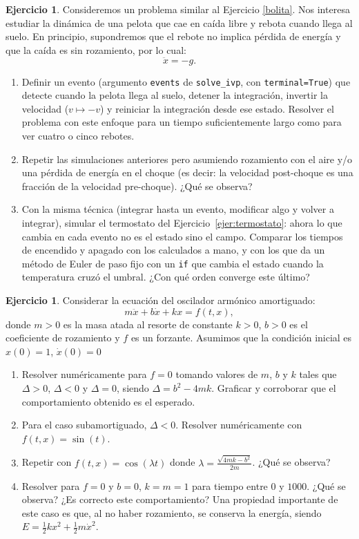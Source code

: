\documentclass[12pt, a4paper]{amsbook}
\theoremstyle{remark}
\theoremstyle{definition}
\newtheorem{ejer}[teo]{Ejercicio}
\numberwithin{section}{chapter}
\numberwithin{subsection}{section}
\numberwithin{equation}{section}
\numberwithin{figure}{chapter}
\begin{document}
\begin{ejer}\label{bouncing-ball}
Consideremos un problema similar al Ejercicio \ref{bolita}. Nos interesa estudiar la dinámica de una pelota que cae en caída libre y rebota cuando llega al suelo. En principio, supondremos que el rebote no implica pérdida de energía y que la caída es sin rozamiento, por lo cual: 
\[\ddot{x} = -g.\]
\begin{enumerate}
\item Definir un evento (argumento \lstinline{events} de \lstinline{solve_ivp}, con \lstinline{terminal=True}) que detecte cuando la pelota llega al suelo, detener la integración, invertir la velocidad ($v\mapsto -v$) y reiniciar la integración desde ese estado. Resolver el problema con este enfoque para un tiempo suficientemente largo como para ver cuatro o cinco rebotes. 
\item Repetir las simulaciones anteriores pero asumiendo rozamiento con el aire y/o una pérdida de energía en el choque (es decir: la velocidad post-choque es una fracción de la velocidad pre-choque). ¿Qué se observa?
\item Con la misma técnica (integrar hasta un evento, modificar algo y volver a integrar), simular el termostato del Ejercicio~\ref{ejer:termostato}: ahora lo que cambia en cada evento no es el estado sino el campo. Comparar los tiempos de encendido y apagado con los calculados a mano, y con los que da un método de Euler de paso fijo con un \lstinline{if} que cambia el estado cuando la temperatura cruzó el umbral. ¿Con qué orden converge este último?
\end{enumerate}
\end{ejer}

\begin{ejer}\label{oscilador-armonico} Considerar la ecuación del oscilador armónico amortiguado:
\[m\ddot{x}+b\dot{x}+kx=f(t,x),\]
donde $m>0$ es la masa atada al resorte de constante $k>0$, $b>0$ es el coeficiente de rozamiento y $f$ es un forzante. Asumimos que la condición inicial es $x(0)=1$, $\dot{x}(0)=0$
\begin{enumerate}
\item Resolver numéricamente para $f=0$ tomando valores de $m$, $b$ y $k$ tales que $\Delta>0$, $\Delta<0$ y $\Delta=0$, siendo $\Delta = b^2-4mk$. Graficar y corroborar que el comportamiento obtenido es el esperado.
\item Para el caso subamortiguado, $\Delta<0$. Resolver numéricamente con $f(t,x) = \sin(t).$
\item Repetir con $f(t,x) = \cos(\lambda t)$ donde $\lambda = \frac{\sqrt{4mk-b^2}}{2m}$. ¿Qué se observa?
\item Resolver para $f=0$ y $b=0$, $k=m=1$ para tiempo entre $0$ y $1000$. ¿Qué se observa? ¿Es correcto este comportamiento? Una propiedad importante de este caso es que, al no haber rozamiento, se conserva la energía, siendo $E = \frac{1}{2}kx^2 + \frac{1}{2}m\dot{x}^2$. 
\end{enumerate}
\end{ejer}
\end{document}
